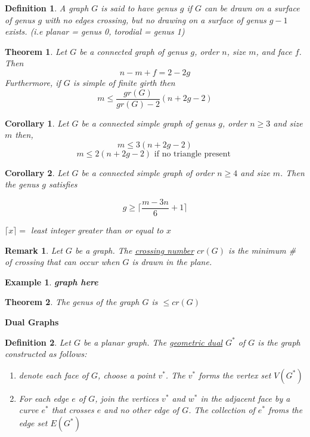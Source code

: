 \documentclass[12pt]{article}
\newtheorem{theorem}{Theorem}
\newtheorem*{corollary}{Corollary}
\newtheorem{example}{Example}
\newtheorem{definition}{Definition}
\newtheorem*{remark}{Remark}
\begin{document}
\begin{definition}
A graph $G$ is said to have genus $g$ if $G$ can be drawn on a surface of genus $g$ with no edges crossing, but no drawing on a surface of genus $g-1$ exists. (i.e planar = genus 0, torodial = genus 1)
\end{definition}



\begin{theorem}
  Let $G$ be a connected graph of genus $g$, order $n$, size $m$, and face $f$. Then
  \[n - m + f = 2-2g\]
  Furthermore, if $G$ is simple of finite girth then
  \[m \le \frac{gr(G)}{gr(G) - 2} (n + 2g - 2)\]
\end{theorem}

\begin{corollary}
  Let $G$ be a connected simple graph of genus $g$, order $n\ge 3$ and size $m$ then,
  \[m \le 3(n+2g-2) \]
  \[m \le 2(n+2g-2) \text{ if no triangle present }\]
\end{corollary}


\begin{corollary}
  Let $G$ be a connected simple graph of order $n\ge 4$ and size $m$. Then the genus $g$ satisfies

  \[g \ge \lceil \frac{m-3n}{6} + 1 \rceil\]

  $\lceil x \rceil =$ least integer greater than or equal to $x$
\end{corollary}

\begin{remark}
  Let $G$ be a graph. The \underline{crossing number} $cr(G)$ is the minimum \# of crossing that can occur when $G$ is drawn in the plane.
\end{remark}

\begin{example}
\textbf{graph here}
\end{example}


\begin{theorem}
The genus of the graph $G$ is $\le cr(G)$
\end{theorem}


\textbf{Dual Graphs}

\begin{definition}
  Let $G$ be a planar graph. The \underline{geometric dual} $G^{*}$ of $G$ is the graph constructed as follows:
  \begin{enumerate}
    \item denote each face of $G$, choose a point $v^{*}$. The $v^{*}$ forms the vertex set $V(G^{*})$
    \item For each edge $e$ of $G$, join the vertices $v^{*}$ and $w^{*}$ in the adjacent face by a curve $e^{*}$ that crosses $e$ and no other edge of $G$. The collection of $e^{*}$ froms the edge set $E(G^{*})$
  \end{enumerate}

\end{definition}
\end{document}
